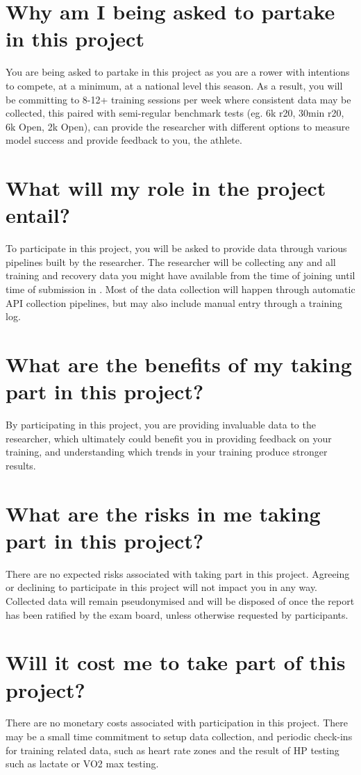 \section*{Why am I being asked to partake in this project}
You are being asked to partake in this project as you are a rower with intentions to compete, at a minimum, at a national level this season. As a result, you will be committing to 8-12+ training sessions per week where consistent data may be collected, this paired with semi-regular benchmark tests (eg. 6k r20, 30min r20, 6k Open, 2k Open), can provide the researcher with different options to measure model success and provide feedback to you, the athlete.
\section*{What will my role in the project entail?}
To participate in this project, you will be asked to provide data through various pipelines built by the researcher. The researcher will be collecting any and all training and recovery data you might have available from the time of joining until time of submission in \deadline. Most of the data collection will happen through automatic API collection pipelines, but may also include manual entry through a training log.
\section*{What are the benefits of my taking part in this project?}
By participating in this project, you are providing invaluable data to the researcher, which ultimately could benefit you in providing feedback on your training, and understanding which trends in your training produce stronger results.
\section*{What are the risks in me taking part in this project?}
There are no expected risks associated with taking part in this project. Agreeing or declining to participate in this project will not impact you in any way. Collected data will remain pseudonymised and will be disposed of once the report has been ratified by the exam board, unless otherwise requested by participants.
\section*{Will it cost me to take part of this project?}
There are no monetary costs associated with participation in this project. There may be a small time commitment to setup data collection, and periodic check-ins for training related data, such as heart rate zones and the result of HP testing such as lactate or VO2 max testing.
